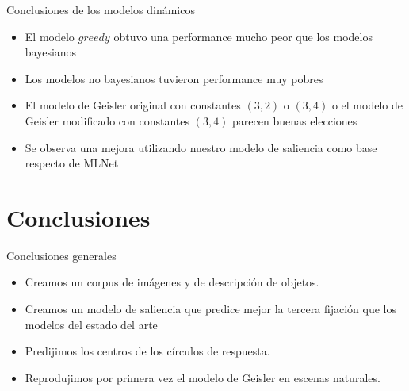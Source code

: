 \documentclass[compress]{beamer}
\begin{document}

\begin{frame}{Conclusiones de los modelos dinámicos}
\begin{itemize}
\item El modelo $greedy$ obtuvo una performance mucho peor que los modelos bayesianos
\item Los modelos no bayesianos tuvieron performance muy pobres
\item El modelo de Geisler original con constantes $(3,2)$ o $(3,4)$ o el modelo de Geisler modificado con constantes $(3,4)$ parecen buenas elecciones
\item Se observa una mejora utilizando nuestro modelo de saliencia como base respecto de MLNet
\end{itemize}
\end{frame}

\section{Conclusiones}
\begin{frame}{Conclusiones generales}
\begin{itemize}
\item Creamos un corpus de imágenes y de descripción de objetos.
\item Creamos un modelo de saliencia que predice mejor la tercera fijación que los modelos del estado del arte
\item Predijimos los centros de los círculos de respuesta.
\item Reprodujimos por primera vez el modelo de Geisler en escenas naturales.
\end{itemize}
\end{frame}
\end{document}
